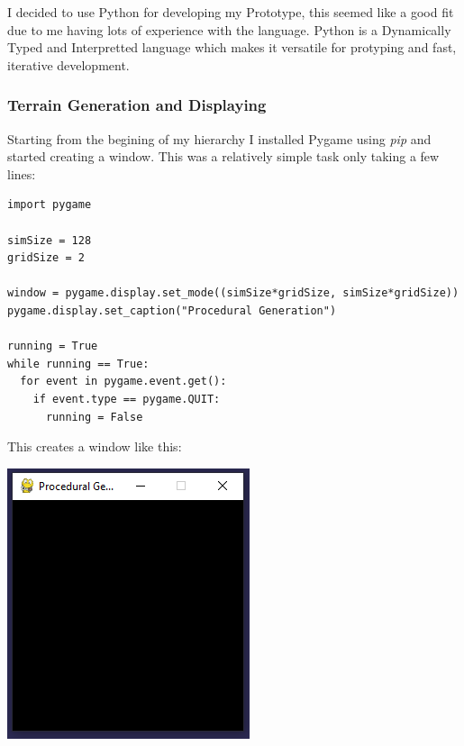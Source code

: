 \begin{flushleft}
            I decided to use Python for developing my Prototype, this seemed like a good fit due to me 
            having lots of experience with the language. Python is a Dynamically Typed and Interpretted 
            language which makes it versatile for protyping and fast, iterative development.
            
            \vspace{0.5cm}

            \subsubsection{Terrain Generation and Displaying}
            \vspace{0.25cm}

            Starting from the begining of my hierarchy I installed Pygame using \textit{pip} and started creating a window.
            This was a relatively simple task only taking a few lines:
            \vspace{0.5cm}

            \normalsize
            \begin{verbatim}
import pygame

simSize = 128
gridSize = 2

window = pygame.display.set_mode((simSize*gridSize, simSize*gridSize))
pygame.display.set_caption("Procedural Generation")

running = True
while running == True:
  for event in pygame.event.get():
    if event.type == pygame.QUIT:
      running = False
            \end{verbatim}

            \vspace{0.5cm}

            \large
            This creates a window like this: \\ 
            \vspace{0.5cm}
            \centerline{\includegraphics{Images/Prototype/CreateWindowExample.PNG}}


\end{flushleft}
